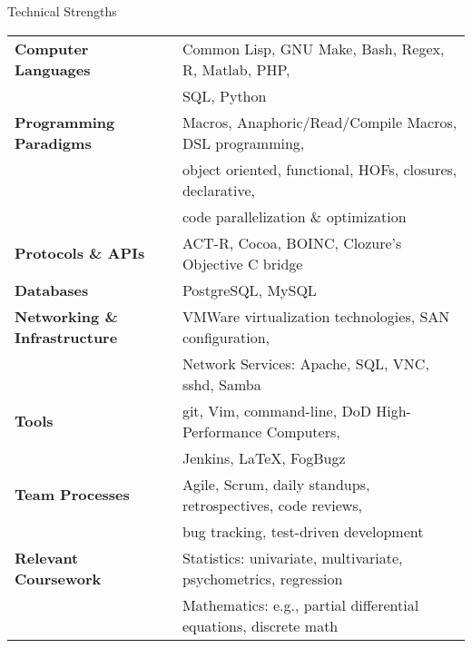 

\begin{rSection}{Technical Strengths}

\begin{tabular}{ @{} >{\bfseries}l @{\hspace{6ex}} l }
Computer Languages & 		Common Lisp, GNU Make, Bash, Regex, R, Matlab, PHP, \\
& 				SQL, Python \\
Programming Paradigms &		Macros, Anaphoric/Read/Compile Macros, DSL programming, \\
& 				object oriented, functional, HOFs, closures, declarative, \\
&				code parallelization \& optimization \\
Protocols \& APIs & 		ACT-R, Cocoa, BOINC, Clozure's Objective C bridge \\
Databases &			PostgreSQL, MySQL \\
Networking \& Infrastructure &	VMWare virtualization technologies, SAN configuration, \\
&				Network Services: Apache, SQL, VNC, sshd, Samba \\
Tools & 			git, Vim, command-line, DoD High-Performance Computers, \\
&				Jenkins, \LaTeX, FogBugz \\
Team Processes & 		Agile, Scrum, daily standups, retrospectives, code reviews, \\
& 				bug tracking, test-driven development \\
Relevant Coursework &		Statistics: univariate, multivariate, psychometrics, regression \\
&				Mathematics: e.g., partial differential equations, discrete math
\end{tabular}

\end{rSection}

